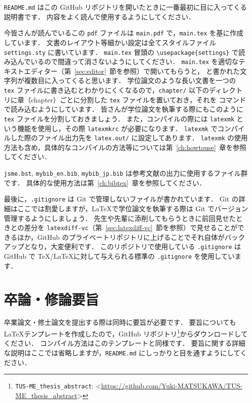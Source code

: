\verb|README.md| はこの GitHub リポジトリを開いたときに一番最初に目に入ってくる説明書です．
内容をよく読んで使用するようにしてください．

今皆さんが読んでいるこの \verb|pdf| ファイルは \verb|main.pdf| で，\verb|main.tex| を基に作成しています．
文書のレイアウト等細かい設定は全てスタイルファイル \verb|settings.sty| に書いています．
\verb|main.tex| 冒頭の \verb|\usepackage{settings}| で読み込んでいるので間違って消さないようにしてください．
\verb|main.tex| を適切なテキストエディター（第~\ref{sec:editor}~節を参照）で開いてもらうと，\verb|| と書かれた文字列が複数目に入ってくると思います．
学位論文のような長い文書を一つの \verb|tex| ファイルに書き込むとわかりにくくなるので，\verb|chapter/| 以下のディレクトリに章（chapter）ごとに分割した \verb|tex| ファイルを置いておき，それを \verb|| コマンドで読み込むようにしています．
皆さんが学位論文を執筆する際にもこのように \verb|tex| ファイルを分割しておきましょう．
また，コンパイルの際には \verb|latexmk| という機能を使用し，その際 \verb|latexmkrc| が必要になります．
\verb|latexmk| でコンパイルした際のファイル出力先を \verb|latex.out/| に設定してあります．
\verb|latexmk| の使用方法も含め，具体的なコンパイルの方法等については第~\ref{ch:howtouse}~章を参照してください．

\verb|jsme.bst|, \verb|mybib_en.bib|, \verb|mybib_jp.bib| は参考文献の出力に使用するファイル群です．
具体的な使用方法は第~\ref{ch:bibtex}~章を参照してください．

最後に，\verb|.gitignore| は Git で管理しないファイルが書かれています．
Git の詳細はここでは割愛しますが，\LaTeX で学位論文を執筆する際は Git でバージョン管理するようにしましょう．
先生や先輩に添削してもらうときに前回見せたときとの差分を \verb|latexdiff-vc|（第~\ref{sec:latexdiff-vc}~節を参照）で見せることができるほか，GitHub のプライベートリポジトリに上げることでそれ自体がバックアップとなり，大変便利です．
このリポジトリで使用している \verb|.gitignore| は GitHub で \TeX/\LaTeX に対して与えられる標準の \verb|.gitignore| を使用しています．

\section{卒論・修論要旨}
\label{sec:abstract}

卒業論文・修士論文を提出する際は同時に要旨が必要です．
要旨についても \LaTeX テンプレートを作成したので，GitHub リポジトリ\footnote{\texttt{TUS-ME\_thesis\_abstract}: \textless\url{https://github.com/Yuki-MATSUKAWA/TUS-ME_thesis_abstract}\textgreater}からダウンロードしてください．
コンパイル方法はこのテンプレートと同様です．
要旨に関する詳細な説明はここでは省略しますが，\verb|README.md| にしっかりと目を通すようにしてください．

